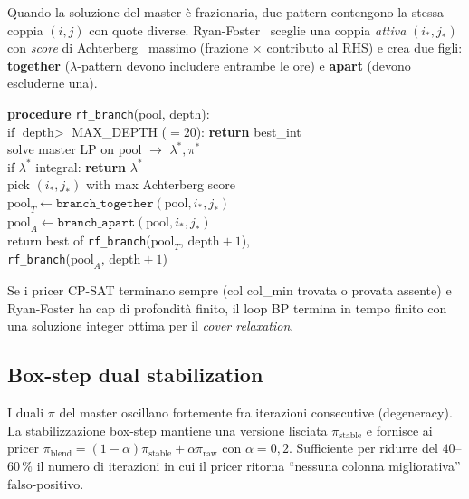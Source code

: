 Quando la soluzione del master \`e frazionaria, due pattern
contengono la stessa coppia $(i, j)$ con quote diverse.
Ryan-Foster~\parencite{ryanfoster1981} sceglie una coppia
\emph{attiva} $(i_*, j_*)$ con \emph{score} di
Achterberg~\parencite{achterberg2005} massimo (frazione $\times$
contributo al RHS) e crea due figli:
\textbf{together} ($\lambda$-pattern devono includere entrambe
le ore) e \textbf{apart} (devono escluderne una).

\begin{schemabox}[title={Pseudocodice -- Ryan-Foster recursive tree}]
\sffamily\small
\textbf{procedure} \texttt{rf\_branch}($\text{pool}$, $\text{depth}$):\\[2pt]
\hphantom{XX} if $\text{depth} > $ MAX\_DEPTH ($=20$): \textbf{return} best\_int\\
\hphantom{XX} solve master LP on $\text{pool}$ $\to$ $\lambda^*, \pi^*$\\
\hphantom{XX} if $\lambda^*$ integral: \textbf{return} $\lambda^*$\\
\hphantom{XX} pick $(i_*, j_*)$ with max Achterberg score\\
\hphantom{XX} $\text{pool}_T \gets \texttt{branch\_together}(\text{pool}, i_*, j_*)$\\
\hphantom{XX} $\text{pool}_A \gets \texttt{branch\_apart}(\text{pool}, i_*, j_*)$\\
\hphantom{XX} return best of \texttt{rf\_branch}($\text{pool}_T$, $\text{depth}+1$),\\
\hphantom{XXXX} \texttt{rf\_branch}($\text{pool}_A$, $\text{depth}+1$)
\end{schemabox}

\begin{teorema}
Se i pricer CP-SAT terminano sempre (col col\_min trovata o
provata assente) e Ryan-Foster ha cap di profondit\`a finito,
il loop BP termina in tempo finito con una soluzione integer
ottima per il \emph{cover relaxation}.
\end{teorema}

\subsection{Box-step dual stabilization}

I duali $\pi$ del master oscillano fortemente fra iterazioni
consecutive (degeneracy). La stabilizzazione box-step
mantiene una versione lisciata $\pi_{\text{stable}}$ e fornisce
ai pricer
$\pi_{\text{blend}} = (1-\alpha)\pi_{\text{stable}} +
\alpha \pi_{\text{raw}}$
con $\alpha = 0{,}2$. Sufficiente per ridurre del $40$--$60\,\%$
il numero di iterazioni in cui il pricer ritorna ``nessuna
colonna migliorativa'' falso-positivo.

